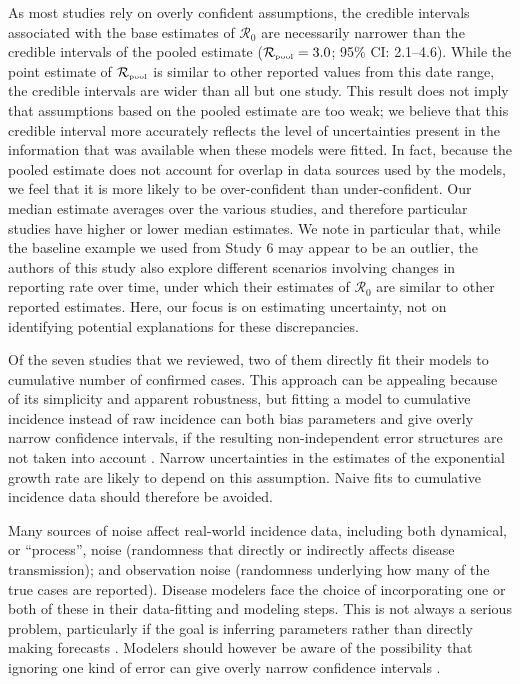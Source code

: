\documentclass[12pt]{article}
\newcommand{\Ro}{\ensuremath{{\mathcal R}_{0}}\xspace}
\newcommand{\Rpool}{\ensuremath{{\mathcal R}_{\textrm{\tiny{pool}}}}\xspace}
\begin{document}
As most studies rely on overly confident assumptions, the credible intervals associated with the base estimates of \Ro are necessarily narrower than the credible intervals of the pooled estimate ($\Rpool = 3.0$; 95\% CI: 2.1--4.6).
While the point estimate of \Rpool is similar to other reported values from this date range, the credible intervals are wider than all but one study.
This result does not imply that assumptions based on the pooled estimate are too weak;
we believe that this credible interval more accurately reflects the level of uncertainties present in the information that was available when these models were fitted.
In fact, because the pooled estimate does not account for overlap in data sources used by the models, we feel that it is more likely to be over-confident than under-confident.
Our median estimate averages over the various studies, and therefore particular studies have higher or lower median estimates.
We note in particular that, while the baseline example we used from Study 6 may appear to be an outlier, the authors of this study also explore different scenarios involving changes in reporting rate over time, under which their estimates of \Ro are similar to other reported estimates.
Here, our focus is on estimating uncertainty, not on identifying potential explanations for these discrepancies.

Of the seven studies that we reviewed, two of them directly fit their models to cumulative number of confirmed cases.
This approach can be appealing because of its simplicity and apparent robustness, but fitting a model to cumulative incidence instead of raw incidence can both bias parameters and give overly narrow confidence intervals, if the resulting non-independent error structures are not taken into account \citep{ma2014estimating, king2015avoidable}.
Narrow uncertainties in the estimates of the exponential growth rate are likely to depend on this assumption.
Naive fits to cumulative incidence data should therefore be avoided.

Many sources of noise affect real-world incidence data, including both dynamical, or ``process'', noise (randomness that directly or indirectly affects disease transmission); and observation noise (randomness underlying how many of the true cases are reported).  
Disease modelers face the choice of incorporating one or both of these in their data-fitting and modeling steps. 
This is not always a serious problem, particularly if the goal is inferring parameters rather than directly making forecasts \citep{ma2014estimating}.
Modelers should however be aware of the possibility that ignoring one kind of error can give overly narrow confidence intervals \citep{king2015avoidable,taylor2016stochasticity}.
\end{document}
